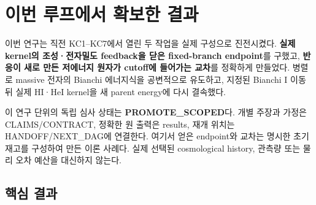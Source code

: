 \hypertarget{uxc774uxbc88-uxb8e8uxd504uxc5d0uxc11c-uxd655uxbcf4uxd55c-uxacb0uxacfc}{%
\section{이번 루프에서 확보한 결과}\label{uxc774uxbc88-uxb8e8uxd504uxc5d0uxc11c-uxd655uxbcf4uxd55c-uxacb0uxacfc}}

이번 연구는 직전 KC1--KC7에서 열린 두 작업을 실제 구성으로 진전시켰다. \textbf{실제 kernel의 조성·전자밀도 feedback을 닫은 fixed-branch endpoint}를 구했고, \textbf{반응이 새로 만든 저에너지 원자가 cutoff에 들어가는 교차}를 정확하게 만들었다. 병렬로 massive 전자의 Bianchi 에너지식을 공변적으로 유도하고, 지정된 Bianchi I 이동 뒤 실제 HI·HeI kernel을 새 parent energy에 다시 결속했다.

이 연구 단위의 독립 심사 상태는 \textbf{PROMOTE\_SCOPED}다. 개별 주장과 가정은 CLAIMS/CONTRACT, 정확한 원 출력은 results, 재개 위치는 HANDOFF/NEXT\_DAG에 연결한다. 여기서 얻은 endpoint와 교차는 명시한 초기 재고를 구성하여 만든 이론 사례다. 실제 선택된 cosmological history, 관측량 또는 물리 오차 예산을 대신하지 않는다.

\hypertarget{uxd575uxc2ec-uxacb0uxacfc}{%
\subsection{핵심 결과}\label{uxd575uxc2ec-uxacb0uxacfc}}

